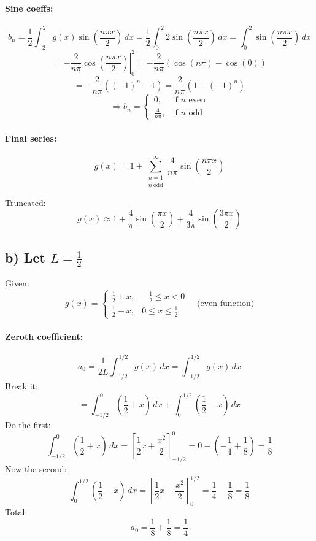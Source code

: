 \documentclass{article}
\begin{document}
\paragraph{Sine coeffs:}
\[
b_n = \frac{1}{2} \int_{-2}^{2} g(x) \sin\left( \frac{n\pi x}{2} \right)\,dx
= \frac{1}{2} \int_0^2 2 \sin\left( \frac{n\pi x}{2} \right)\,dx
= \int_0^2 \sin\left( \frac{n\pi x}{2} \right)\,dx
\]
\[
= \left. -\frac{2}{n\pi} \cos\left( \frac{n\pi x}{2} \right) \right|_0^2
= -\frac{2}{n\pi} \left( \cos(n\pi) - \cos(0) \right)
\]
\[
= -\frac{2}{n\pi} \left( (-1)^n - 1 \right) = \frac{2}{n\pi} (1 - (-1)^n)
\]
\[
\Rightarrow b_n =
\begin{cases}
0, & \text{if } n \text{ even} \\
\frac{4}{n\pi}, & \text{if } n \text{ odd}
\end{cases}
\]

\paragraph{Final series:}
\[
g(x) = 1 + \sum_{\substack{n=1 \\ n\ \text{odd}}}^\infty \frac{4}{n\pi} \sin\left( \frac{n\pi x}{2} \right)
\]

Truncated:
\[
g(x) \approx 1 + \frac{4}{\pi} \sin\left( \frac{\pi x}{2} \right) + \frac{4}{3\pi} \sin\left( \frac{3\pi x}{2} \right)
\]

\subsection*{b) Let \( L = \frac{1}{2} \)}

Given:
\[
g(x) =
\begin{cases}
\frac{1}{2} + x, & -\frac{1}{2} \le x < 0 \\
\frac{1}{2} - x, & 0 \le x \le \frac{1}{2}
\end{cases}
\quad \text{(even function)}
\]

\paragraph{Zeroth coefficient:}
\[
a_0 = \frac{1}{2L} \int_{-1/2}^{1/2} g(x)\,dx = \int_{-1/2}^{1/2} g(x)\,dx
\]
Break it:
\[
= \int_{-1/2}^{0} \left( \frac{1}{2} + x \right)\,dx + \int_0^{1/2} \left( \frac{1}{2} - x \right)\,dx
\]
Do the first:
\[
\int_{-1/2}^{0} \left( \frac{1}{2} + x \right)\,dx = \left[ \frac{1}{2}x + \frac{x^2}{2} \right]_{-1/2}^{0}
= 0 - \left( -\frac{1}{4} + \frac{1}{8} \right) = \frac{1}{8}
\]
Now the second:
\[
\int_0^{1/2} \left( \frac{1}{2} - x \right)\,dx = \left[ \frac{1}{2}x - \frac{x^2}{2} \right]_0^{1/2}
= \frac{1}{4} - \frac{1}{8} = \frac{1}{8}
\]
Total:
\[
a_0 = \frac{1}{8} + \frac{1}{8} = \frac{1}{4}
\]
\end{document}
